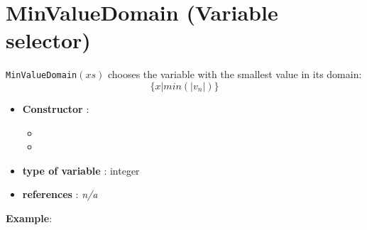 \section{MinValueDomain (Variable selector)}\label{minvaldomain:minvaldomainvarselector}\hypertarget{minvaldomain:minvaldomainvarselector}{}
\begin{notedef}
  \texttt{MinValueDomain}$(xs)$ chooses the variable with the smallest value in its domain:
$$\{x | min(|v_{n}|)\}$$
\end{notedef}

\begin{itemize}
	\item \textbf{Constructor} : 
	\begin{itemize}
	\item {}
	\item {}
	\end{itemize}	
	\item \textbf{type of variable} : integer
	\item \textbf{references} : \emph{n/a}
\end{itemize}

\textbf{Example}:
%

